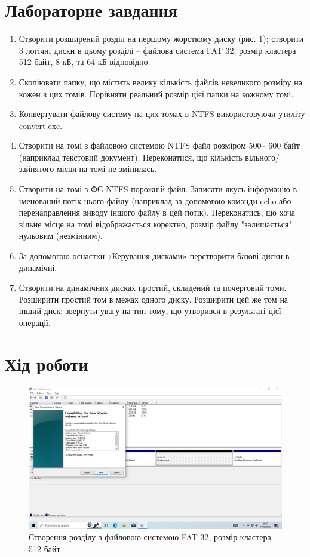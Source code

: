 \documentclass[oneside,14pt]{extarticle}
\begin{document}
\begin{normalsize}
    \section*{Лабораторне завдання}
	\begin{enumerate}
		\item Створити розширений розділ на першому жорсткому диску (рис. 1);
		створити 3 логічні диски в цьому розділі – файлова система FAT 32, розмір
		кластера 512 байт, 8 кБ, та 64 кБ відповідно.
		\item Скопіювати папку, що містить велику кількість файлів невеликого
		розміру на кожен з цих томів. Порівняти реальний
		розмір цієї папки на кожному томі.
		\item Конвертувати файлову систему на цих томах в NTFS
		використовуючи утиліту convert.exe.
		\item Створити на томі з файловою системою NTFS файл розміром 500–
		600 байт (наприклад текстовий документ). Переконатися, що кількість
		вільного/зайнятого місця на томі не змінилась.
		\item Створити на томі з ФС NTFS порожній файл. Записати якусь
		інформацію в іменований потік цього файлу (наприклад за допомогою команди
		echo або перенаправлення виводу іншого файлу в цей потік). Переконатись, що хоча вільне місце на томі відображається коректно, розмір
		файлу "залишається" нульовим (незмінним).
		\item За допомогою оснастки «Керування дисками» перетворити базові диски
		в динамічні.
		\item Створити на динамічних дисках простий, складений та почерговий томи.
		Розширити простий том в межах одного диску. Розширити цей же том на інший
		диск; звернути увагу на тип тому, що утворився в результаті цієї операції.
	\end{enumerate}

	\section*{Хід роботи}
	
	\begin{figure}[H]
		\centering
		\includegraphics[scale=0.4]{1}
		\caption{Створення розділу з файловою системою FAT 32, розмір кластера 512 байт}
	\end{figure}
	

\end{normalsize}
\end{document}
